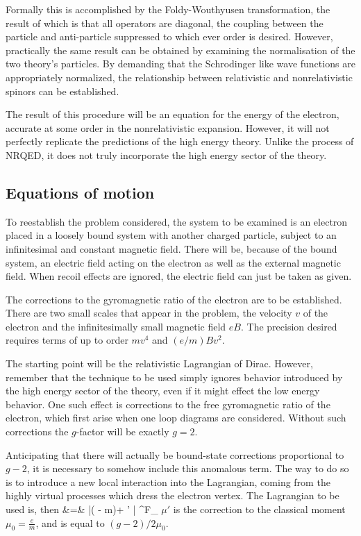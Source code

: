 Formally this is accomplished by the Foldy-Wouthyusen transformation, the result of which is that all operators are diagonal, the coupling between the particle and anti-particle suppressed to which ever order is desired.  However, practically the same result can be obtained by examining the normalisation of the two theory's particles.  By demanding that the Schrodinger like wave functions are appropriately normalized, the relationship between relativistic and nonrelativistic spinors can be established.

The result of this procedure will be an equation for the energy of the electron, accurate at some order in the nonrelativistic expansion.  However, it will not perfectly replicate the predictions of the high energy theory.  Unlike the process of NRQED, it does not truly incorporate the high energy sector of the theory.



\subsection{Equations of motion}

To reestablish the problem considered, the system to be examined is an electron placed in a loosely bound system with another charged particle, subject to an infinitesimal and constant magnetic field.  There will be, because of the bound system, an electric field acting on the electron as well as the external magnetic field.  When recoil effects are ignored, the electric field can just be taken as given.

The corrections to the gyromagnetic ratio of the electron are to be established.  There are two small scales that appear in the problem, the velocity $v$ of the electron and the infinitesimally small magnetic field $eB$.  The precision desired requires terms of up to order $mv^4$ and $ (e/m)Bv^2$.

The starting point will be the relativistic Lagrangian of Dirac.  However, remember that the technique to be used simply ignores behavior introduced by the high energy sector of the theory, even if it might effect the low energy behavior.  One such effect is corrections to the free gyromagnetic ratio of the electron, which first arise when one loop diagrams are considered.  Without such corrections the $g$-factor will be exactly $g=2$.

Anticipating that there will actually be bound-state corrections proportional to $g-2$, it is necessary to somehow include this anomalous term.  The way to do so is to introduce a new local interaction into the Lagrangian, coming from the highly virtual processes which dress the electron vertex.  The Lagrangian to be used is, then
\beqa
{} &=&	
	\bar{\Psi}( - m)\Psi +  \mu' \bar{\Psi} \sigma^{\mu\nu}F_{\mu\nu} \Psi	
\eeqa
$\mu'$ is the correction to the classical moment $\mu_0 = \frac{e}{m}$, and is equal to $(g-2)/2 \mu_0$.


